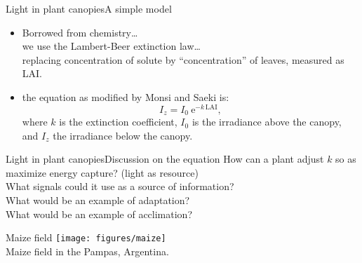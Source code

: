 \documentclass[10pt]{beamer}\usepackage[]{graphicx}\usepackage[]{color}
\begin{document}
\begin{frame}{Light in plant canopies}{A simple model}
    \begin{itemize}
        \item Borrowed from chemistry\ldots\\
        we use the Lambert-Beer extinction law\ldots\\
        replacing concentration of solute by ``concentration'' of
        leaves, measured as LAI.
        \item the equation as modified by Monsi and Saeki is:
        $$I_z = I_0\ \mathrm{e}^{-k\, \mathrm{LAI}},$$
        where $k$ is the extinction coefficient, $I_0$ is the
        irradiance above the canopy, and $I_z$ the irradiance below
        the canopy.
    \end{itemize}
\end{frame}

\begin{frame}{Light in plant canopies}{Discussion on the equation}
    How can a plant adjust $k$ so as maximize energy capture? (light as resource)\\
    What signals could it use as a source of information?\\
    What would be an example of adaptation?\\
    What would be an example of acclimation?
\end{frame}

\begin{frame}{Maize field}
    \centering
    \texttt{[image: figures/maize]}\\
    {\small Maize field in the Pampas, Argentina.}
\end{frame}
\end{document}
